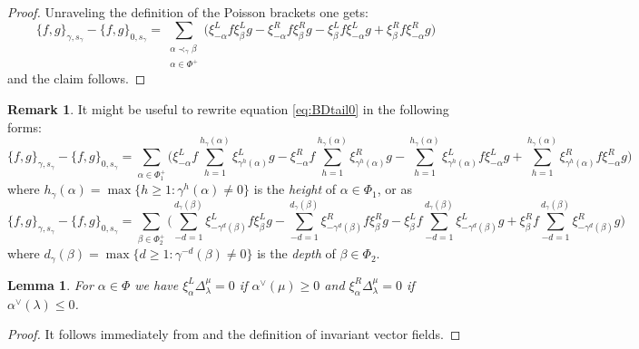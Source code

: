 \documentclass[a4paper]{amsart}
\newtheorem{lemma}[theorem]{Lemma}
\theoremstyle{definition}
\newtheorem{remark}[theorem]{Remark}
\begin{document}
\begin{proof}
  Unraveling the definition of the Poisson brackets one gets:
  \begin{equation}
    \label{eq:BDtail0}
    \{f,g\}_{\gamma,s_\gamma} - \{f,g\}_{0,s_\gamma}
    = 
    \sum_{\substack{\alpha\prec_\gamma\beta\\ \alpha\in\Phi^+}} \Big(\xi_{-\alpha}^L f \xi_\beta^L g - \xi_{-\alpha}^R f \xi_\beta^R g - \xi_\beta^L f \xi_{-\alpha}^L g + \xi_\beta^R f \xi_{-\alpha}^R g\Big)
  \end{equation}
  and the claim follows.
\end{proof}

\begin{remark}
  It might be useful to rewrite equation \eqref{eq:BDtail0} in the following forms:
  \begin{equation}
    \label{eq:BDtail1}
    \{f,g\}_{\gamma,s_\gamma} - \{f,g\}_{0,s_\gamma}
    = 
    \sum_{\alpha\in\Phi_1^+} 
    \Big(
      \xi_{-\alpha}^L f \sum_{h=1}^{h_\gamma(\alpha)} \xi_{\gamma^h(\alpha)}^L g 
      -\xi_{-\alpha}^R f \sum_{h=1}^{h_\gamma(\alpha)} \xi_{\gamma^h(\alpha)}^R g
      - \sum_{h=1}^{h_\gamma(\alpha)} \xi_{\gamma^h(\alpha)}^L f \xi_{-\alpha}^L g
      + \sum_{h=1}^{h_\gamma(\alpha)} \xi_{\gamma^h(\alpha)}^R f \xi_{-\alpha}^R g
    \Big)
  \end{equation}
  where $h_\gamma(\alpha)=\max\{h\ge1:\gamma^h(\alpha)\ne0\}$ is the \emph{height} of $\alpha\in\Phi_1$, or as
  \begin{equation}
    \label{eq:BDtail2}
    \{f,g\}_{\gamma,s_\gamma} - \{f,g\}_{0,s_\gamma}
    = 
    \sum_{\beta\in\Phi_2^+} 
    \Big(
      \sum_{-d=1}^{d_\gamma(\beta)}\xi_{-\gamma^d(\beta)}^L f \xi_\beta^L g 
      -\sum_{-d=1}^{d_\gamma(\beta)}\xi_{-\gamma^d(\beta)}^R f \xi_\beta^R g
      - \xi_\beta^L f \sum_{-d=1}^{d_\gamma(\beta)}\xi_{-\gamma^d(\beta)}^L g
      + \xi_\beta^R f \sum_{-d=1}^{d_\gamma(\beta)}\xi_{-\gamma^d(\beta)}^R g
    \Big)
  \end{equation}
  where $d_\gamma(\beta)=\max\{d\ge1:\gamma^{-d}(\beta)\ne0\}$ is the \emph{depth} of $\beta\in\Phi_2$.
\end{remark}

\begin{lemma} For $\alpha\in\Phi$ we have $\xi_\alpha^L \Delta_\lambda^\mu = 0$ if $\alpha^\vee(\mu)\geq0$ and $\xi_\alpha^R \Delta_\lambda^\mu = 0$ if $\alpha^\vee(\lambda)\leq0$.
\end{lemma}
\begin{proof}
  It follows immediately from \cite[Lemma 2.6]{RSW17} and the definition of invariant vector fields.
\end{proof}
\end{document}
